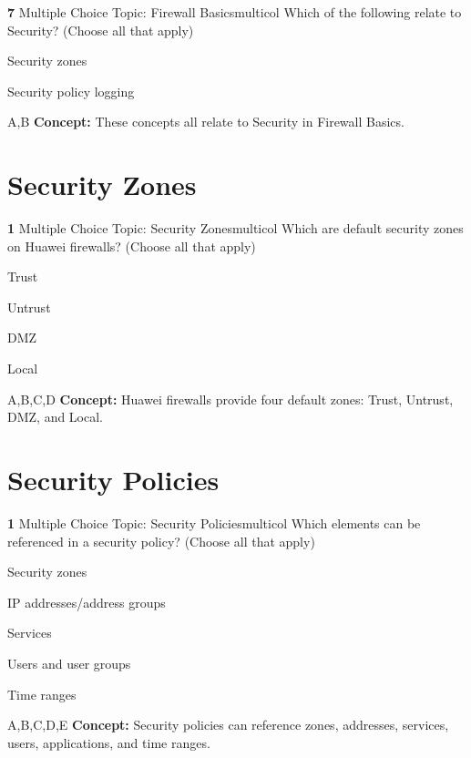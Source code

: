 \documentclass[10pt,a4paper]{article}
\begin{document}
\begin{qcard}{\color{white}\textbf{7} \hfill \small Multiple Choice \textbar{} Topic: Firewall Basics}{multicol}
Which of the following relate to Security? (Choose all that apply)

\begin{qoptions}
\item Security zones
\item Security policy logging
\end{qoptions}
\begin{explainbox}{A,B}
\textbf{Concept:} These concepts all relate to Security in Firewall Basics.
\end{explainbox}
\end{qcard}

\section{Security Zones}
\begin{qcard}{\color{white}\textbf{1} \hfill \small Multiple Choice \textbar{} Topic: Security Zones}{multicol}
Which are default security zones on Huawei firewalls? (Choose all that apply)

\begin{qoptions}
\item Trust
\item Untrust
\item DMZ
\item Local
\end{qoptions}
\begin{explainbox}{A,B,C,D}
\textbf{Concept:} Huawei firewalls provide four default zones: Trust, Untrust, DMZ, and Local.
\end{explainbox}
\end{qcard}

\section{Security Policies}
\begin{qcard}{\color{white}\textbf{1} \hfill \small Multiple Choice \textbar{} Topic: Security Policies}{multicol}
Which elements can be referenced in a security policy? (Choose all that apply)

\begin{qoptions}
\item Security zones
\item IP addresses/address groups
\item Services
\item Users and user groups
\item Time ranges
\end{qoptions}
\begin{explainbox}{A,B,C,D,E}
\textbf{Concept:} Security policies can reference zones, addresses, services, users, applications, and time ranges.
\end{explainbox}
\end{qcard}
\end{document}
